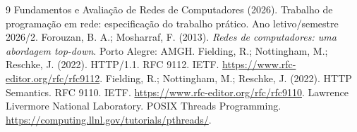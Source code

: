 \documentclass[12pt,a4paper]{article}
\begin{document}
\begin{thebibliography}{9}
 Fundamentos e Avaliação de Redes de Computadores (2026). Trabalho de
programação em rede: especificação do trabalho prático. Ano letivo/semestre 2026/2.
 Forouzan, B. A.; Mosharraf, F. (2013). \emph{Redes de computadores: uma
abordagem top-down}. Porto Alegre: AMGH.
 Fielding, R.; Nottingham, M.; Reschke, J. (2022). HTTP/1.1. RFC 9112.
IETF. \url{https://www.rfc-editor.org/rfc/rfc9112}.
 Fielding, R.; Nottingham, M.; Reschke, J. (2022). HTTP Semantics.
RFC 9110. IETF. \url{https://www.rfc-editor.org/rfc/rfc9110}.
 Lawrence Livermore National Laboratory. POSIX Threads Programming.
\url{https://computing.llnl.gov/tutorials/pthreads/}.
\end{thebibliography}
\end{document}
